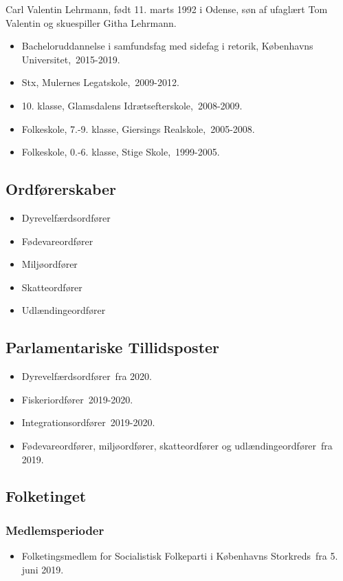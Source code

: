 \documentclass[11pt, a4paper]{awesome-cv}
\begin{document}
\makecvheader[R]
\makelettertitle
\begin{cvletter}
Carl Valentin Lehrmann, født 11. marts 1992 i Odense, søn af ufaglært Tom Valentin og skuespiller Githa Lehrmann.

\begin{itemize}
\item Bacheloruddannelse i samfundsfag med sidefag i retorik, Københavns Universitet, 2015-2019.
\item Stx, Mulernes Legatskole, 2009-2012.
\item 10. klasse, Glamsdalens Idrætsefterskole, 2008-2009.
\item Folkeskole, 7.-9. klasse, Giersings Realskole, 2005-2008.
\item Folkeskole, 0.-6. klasse, Stige Skole, 1999-2005.
\end{itemize}
\subsection*{Ordførerskaber}
\begin{itemize}
\item Dyrevelfærdsordfører
\item Fødevareordfører
\item Miljøordfører
\item Skatteordfører
\item Udlændingeordfører
\end{itemize}
\subsection*{Parlamentariske Tillidsposter}
\begin{itemize}
\item Dyrevelfærdsordfører fra 2020.
\item Fiskeriordfører 2019-2020.
\item Integrationsordfører 2019-2020.
\item Fødevareordfører, miljøordfører, skatteordfører og udlændingeordfører fra 2019.
\end{itemize}
\subsection*{Folketinget}
\subsubsection*{Medlemsperioder}
\begin{itemize}
\item Folketingsmedlem for Socialistisk Folkeparti i Københavns Storkreds fra 5. juni 2019.
\end{itemize}

\end{cvletter}
\end{document}
